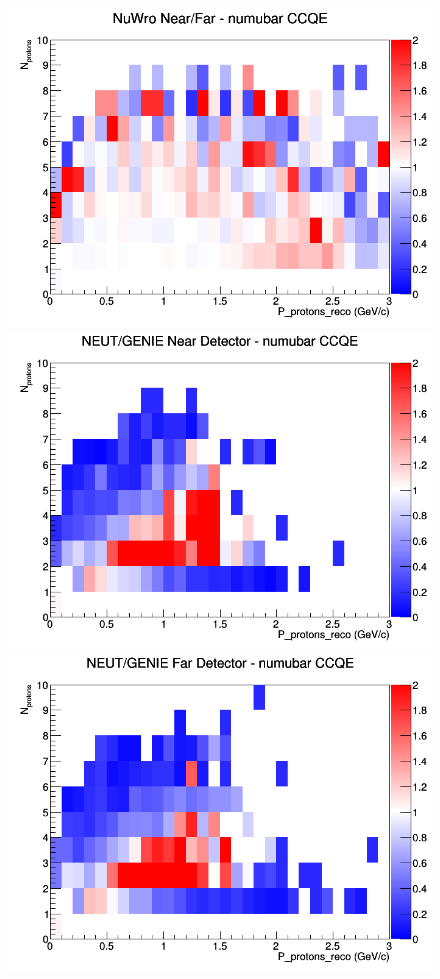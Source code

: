 \begin{figure}[h]
\endminipage
{}
\includegraphics[width=\linewidth]{eff_N_P/LAr/protons/ratios/CCQE_NuWro_numubar_NF_N_P.png}
\endminipage
\newline
{}
\includegraphics[width=\linewidth]{eff_N_P/LAr/protons/ratios/CCQE_NEUT_GENIE_numubar_near_N_P.png}
\endminipage
{}
\includegraphics[width=\linewidth]{eff_N_P/LAr/protons/ratios/CCQE_NEUT_GENIE_numubar_far_N_P.png}

\end{figure}
